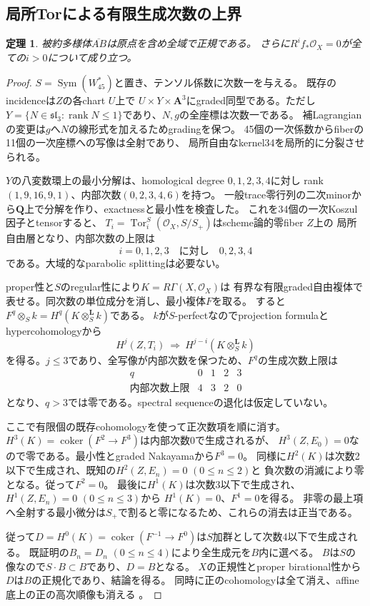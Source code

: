 \documentclass[11pt,a4paper]{ltjsarticle}
\newcommand{\QQ}{\mathbf Q}
\renewcommand{\AA}{\mathbf A}
\DeclareMathOperator{\rank}{rank}
\newtheorem{theorem}{定理}[section]
\theoremstyle{remark}
\begin{document}
\subsection{局所Torによる有限生成次数の上界}
\begin{theorem}\label{thm:ab-normal-v52}
被約多様体$\overline{AB}$は原点を含め全域で正規である。
さらに$R^if_*\mathcal O_X=0$が全ての$i>0$について成り立つ。
\end{theorem}
\begin{proof}
$S=\operatorname{Sym}(W_{45}^*)$と置き、テンソル係数に次数一を与える。
既存のincidenceは$Z$の各chart $U$上で
$U\times Y\times\AA^3$にgraded同型である。ただし
$Y=\{N\in\mathfrak{sl}_3:\rank N\le1\}$であり、$N,g$の全座標は次数一である。
補Lagrangianの変更は$g$へ$N$の線形式を加えるためgradingを保つ。
45個の一次係数からfiberの11個の一次座標への写像は全射であり、
局所自由なkernel34を局所的に分裂させられる。

$Y$の八変数環上の最小分解は、homological degree $0,1,2,3,4$に対し
rank $(1,9,16,9,1)$、内部次数$(0,2,3,4,6)$を持つ。
一般trace零行列の二次minorから$\QQ$上で分解を作り、exactnessと最小性を検査した。
これを34個の一次Koszul因子とtensorすると、
$T_i=\operatorname{Tor}_i^S(\mathcal O_X,S/S_+)$はscheme論的零fiber $Z$上の
局所自由層となり、内部次数の上限は
\[
 i=0,1,2,3\quad\text{に対し}\quad0,2,3,4
\]
である。大域的なparabolic splittingは必要ない。

proper性と$S$のregular性により$K=R\Gamma(X,\mathcal O_X)$は
有界な有限graded自由複体で表せる。同次数の単位成分を消し、最小複体$F$を取る。
すると$F^q\otimes_S k=H^q(K\otimes_S^{\mathbf L}k)$である。
$k$が$S$-perfectなのでprojection formulaとhypercohomologyから
\[
 H^j(Z,T_i)\ \Longrightarrow\ H^{j-i}(K\otimes_S^{\mathbf L}k)
\]
を得る。$j\le3$であり、全写像が内部次数を保つため、$F^q$の生成次数上限は
\[
 \begin{array}{c|rrrr}
 q&0&1&2&3\\\hline
 \text{内部次数上限}&4&3&2&0
 \end{array}
\]
となり、$q>3$では零である。spectral sequenceの退化は仮定していない。

ここで有限個の既存cohomologyを使って正次数項を順に消す。
$H^3(K)=\operatorname{coker}(F^2\to F^3)$は内部次数0で生成されるが、
$H^3(Z,E_0)=0$なので零である。最小性とgraded Nakayamaから$F^3=0$。
同様に$H^2(K)$は次数2以下で生成され、既知の$H^2(Z,E_n)=0$ $(0\le n\le2)$と
負次数の消滅により零となる。従って$F^2=0$。
最後に$H^1(K)$は次数3以下で生成され、$H^1(Z,E_n)=0$ $(0\le n\le3)$から
$H^1(K)=0$、$F^1=0$を得る。
非零の最上項へ全射する最小微分は$S_+$で割ると零になるため、これらの消去は正当である。

従って$D=H^0(K)=\operatorname{coker}(F^{-1}\to F^0)$は$S$加群として次数4以下で生成される。
既証明の$B_n=D_n$ $(0\le n\le4)$により全生成元を$B$内に選べる。
$B$は$S$の像なので$S\cdot B\subset B$であり、$D=B$となる。
$X$の正規性とproper birational性から$D$は$B$の正規化であり、結論を得る。
同時に正のcohomologyは全て消え、affine底上の正の高次順像も消える
\cite{ab-normal-v52,ab-normal-review-v52,stacks-derived-v52}。
\end{proof}
\end{document}
